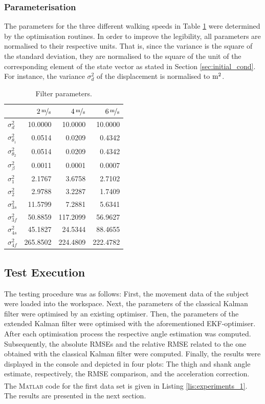 \subsubsection{Parameterisation}

The parameters for the three different walking speeds in Table \ref{tab:parameters} were determined by the optimisation routines. In order to improve the legibility, all parameters are normalised to their respective units. That is, since the variance is the square of the standard deviation, they are normalised to the square of the unit of the corresponding element of the state vector as stated in Section \ref{sec:initial_cond}. For instance, the variance $\sigma^2_d$ of the displacement is normalised to $\unit[]{m^2}$.

\newcommand{\ra}[1]{\renewcommand{\arraystretch}{#1}}
\begin{table}\centering
\ra{1.3}
\begin{tabular}{@{}lrrr@{}}\toprule
 & $\unitfrac[2]{m}{s}$ & $\unitfrac[4]{m}{s}$ & $\unitfrac[6]{m}{s}$ \\
\midrule
$\sigma^2_d$ & 10.0000 & 10.0000 & 10.0000 \\
$\sigma^2_{\theta_1}$ & 0.0514 & 0.0209 & 0.4342 \\
$\sigma^2_{\theta_2}$ & 0.0514 & 0.0209 & 0.4342 \\
$\sigma^2_{\beta}$ & 0.0011 & 0.0001 & 0.0007 \\
$\sigma^2_1$ & 2.1767 & 3.6758 & 2.7102 \\
$\sigma^2_2$ & 2.9788 & 3.2287 & 1.7409 \\
$\sigma^2_{3s}$ & 11.5799 & 7.2881 & 5.6341 \\
$\sigma^2_{3f}$ & 50.8859 & 117.2099 & 56.9627 \\
$\sigma^2_{4s}$ & 45.1827 & 24.5344 & 88.4655 \\
$\sigma^2_{4f}$ & 265.8502 & 224.4809 & 222.4782 \\
\bottomrule
\end{tabular}
\caption{Filter parameters.}
\label{tab:parameters}
\end{table}

\subsection{Test Execution}

The testing procedure was as follows: First, the movement data of the subject were loaded into the workspace. Next, the parameters of the classical Kalman filter were optimised by an existing optimiser. Then, the parameters of the extended Kalman filter were optimised with the aforementioned EKF-optimiser. After each optimisation process the respective angle estimation was computed. Subsequently, the absolute RMSEs and the relative RMSE related to the one obtained with the classical Kalman filter were computed. Finally, the results were displayed in the console and depicted in four plots: The thigh and shank angle estimate, respectively, the RMSE comparison, and the acceleration correction. The \mbox{\textsc{Matlab}\textsuperscript{\textregistered}} code for the first data set is given in Listing \ref{lis:experiments_1}. The results are presented in the next section.

